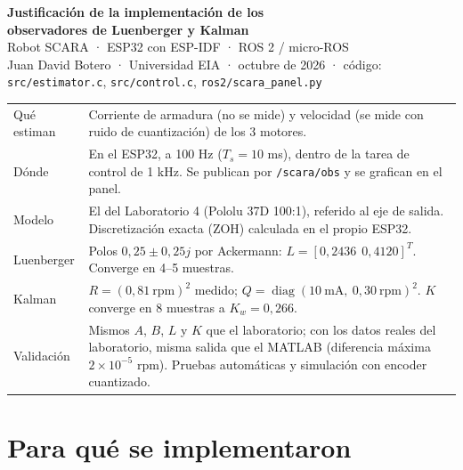 \documentclass[11pt]{article}
\newcommand{\cod}[1]{\texttt{#1}}
\begin{document}
\begin{center}
{\LARGE\bfseries\color{azul} Justificación de la implementación de los\\[0.15em] observadores de Luenberger y Kalman}\\[0.4em]
{\large Robot SCARA · ESP32 con ESP-IDF · ROS 2 / micro-ROS}\\[0.6em]
{\small Juan David Botero · Universidad EIA · octubre de 2026 · código: \cod{src/estimator.c}, \cod{src/control.c}, \cod{ros2/scara\_panel.py}}
\end{center}

\begin{clave}[Resumen]
\small
\begin{tabular}{@{}>{\raggedright\arraybackslash}p{3.6cm}>{\raggedright\arraybackslash}p{12.1cm}@{}}
Qué estiman & Corriente de armadura (no se mide) y velocidad (se mide con ruido de cuantización) de los 3 motores. \\
Dónde & En el ESP32, a 100 Hz ($T_s=10$ ms), dentro de la tarea de control de 1 kHz. Se publican por \cod{/scara/obs} y se grafican en el panel. \\
Modelo & El del Laboratorio 4 (Pololu 37D 100:1), referido al eje de salida. Discretización exacta (ZOH) calculada en el propio ESP32. \\
Luenberger & Polos $0{,}25\pm0{,}25j$ por Ackermann: $L=[0{,}2436\ \ 0{,}4120]^T$. Converge en 4--5 muestras. \\
Kalman & $R=(0{,}81\ \text{rpm})^2$ medido; $Q=\operatorname{diag}(10\ \text{mA},\ 0{,}30\ \text{rpm})^2$. $K$ converge en 8 muestras a $K_w=0{,}266$. \\
Validación & Mismos $A$, $B$, $L$ y $K$ que el laboratorio; con los datos reales del laboratorio, misma salida que el MATLAB (diferencia máxima $2\times10^{-5}$ rpm). Pruebas automáticas y simulación con encoder cuantizado. \\
\end{tabular}
\end{clave}

\section{Para qué se implementaron}
\end{document}
